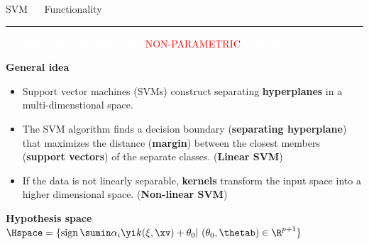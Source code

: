 \documentclass[11pt,compress,t,notes=noshow, xcolor=table]{beamer}
\begin{document}
\LARGE
\begin{frame}{\textcolor{gray!80}{SVM} ~~ Functionality}
\normalsize
\vspace{-0.5cm}
\noindent \textcolor{gray!80}{\rule{\textwidth}{1pt}}

\vspace{0.3cm}

\footnotesize

\colorbox{gray!80}{\textcolor{white}{SUPERVISED}}
\colorbox{gray!80}{\textcolor{white}{PARAMETRIC}}
\colorbox{gray!80}{\textcolor{red}{NON-PARAMETRIC}}
\colorbox{gray!80}{\textcolor{white}{WHITE-BOX}}

\medskip

\textbf{\textcolor{gray!80}{General idea}} ~~
\begin{itemize}

\item Support vector machines (SVMs) construct separating \textbf{hyperplanes} in a multi-dimenstional space.  

\item The SVM algorithm finds a decision boundary (\textbf{separating hyperplane}) that maximizes the distance (\textbf{margin}) between the closest members (\textbf{support vectors}) of the separate classes. (\textbf{Linear SVM})

\item If the data is not linearly separable, \textbf{kernels} transform the input space into a higher dimensional space. (\textbf{Non-linear SVM})

\end{itemize}

\medskip


\textbf{\textcolor{gray!80}{Hypothesis space}} ~~
\textcolor{red}{$\Hspace = \{ \operatorname{sign}\sumin \alpha_i \yi k(\xi, \xv)  + \theta_0  |\ (\theta_0, \thetab) \in \R^{p+1} \} $}


\end{frame}
\end{document}
